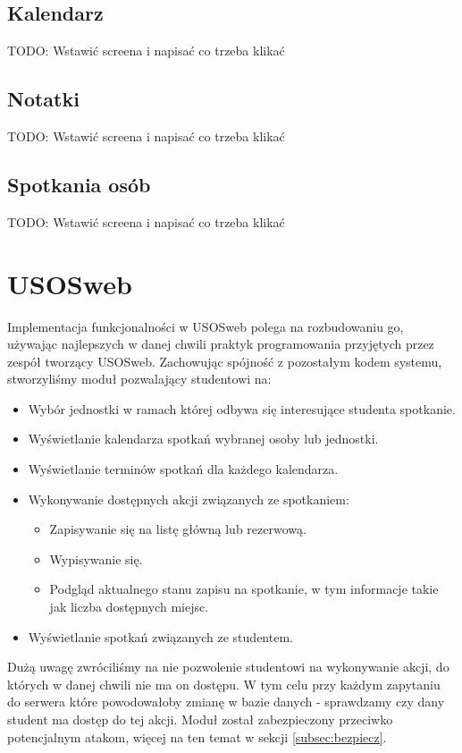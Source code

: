 \documentclass[licencjacka]{pracamgr}
\begin{document}
\subsection{Kalendarz}
TODO: Wstawić screena i napisać co trzeba klikać

\subsection{Notatki}
TODO: Wstawić screena i napisać co trzeba klikać

\subsection{Spotkania osób}
TODO: Wstawić screena i napisać co trzeba klikać



\section{USOSweb}\label{sec:impusosweb}
Implementacja funkcjonalności w USOSweb polega na rozbudowaniu go, używając najlepszych w danej chwili praktyk programowania przyjętych przez zespół tworzący USOSweb. Zachowując spójność z pozostałym kodem systemu, stworzyliśmy moduł pozwalający studentowi na:
\begin{itemize}
\item{Wybór jednostki w ramach której odbywa się interesujące studenta spotkanie.}
\item{Wyświetlanie kalendarza spotkań wybranej osoby lub jednostki.}
\item{Wyświetlanie terminów spotkań dla każdego kalendarza.}
\item{Wykonywanie dostępnych akcji związanych ze spotkaniem:
\begin{itemize}
\item{Zapisywanie się na listę główną lub rezerwową.}
\item{Wypisywanie się.}
\item{Podgląd aktualnego stanu zapisu na spotkanie, w tym informacje takie jak liczba dostępnych miejsc.}
\end{itemize}
}
\item{Wyświetlanie spotkań związanych ze studentem.}
\end{itemize}

Dużą uwagę zwróciliśmy na nie pozwolenie studentowi na wykonywanie akcji, do których w danej chwili nie ma on dostępu. W tym celu przy każdym zapytaniu do serwera które powodowałoby zmianę w bazie danych - sprawdzamy czy dany student ma dostęp do tej akcji. Moduł został zabezpieczony przeciwko potencjalnym atakom, więcej na ten temat w sekcji \ref{subsec:bezpiecz}.
\end{document}
